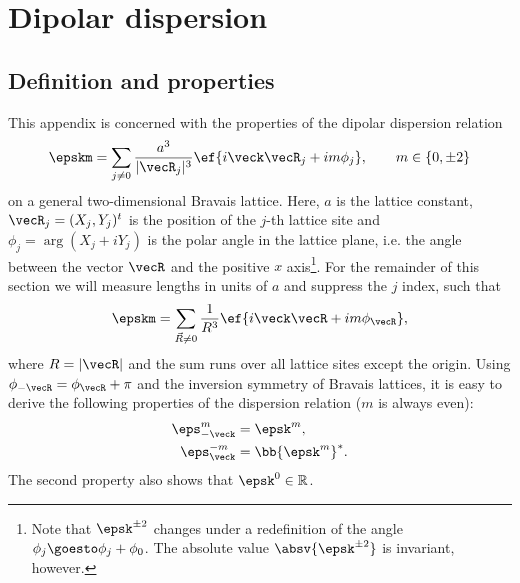 \chapter{Dipolar dispersion}
\label{dipolar_dispersion}

\section{Definition and properties}
This appendix is concerned with the properties of the dipolar dispersion relation~\cite{Peter2012b,Syzranov2014,Peter2014}
\begin{align}
    \epskm = \sum_{j\ne 0} \frac{a^3}{|\vecR_j|^3}\ef{i\veck \vecR_j + i m \phi_{j}},\qquad m \in \{0, \pm 2\}
\end{align}
on a general two-dimensional Bravais lattice.
Here, $a$ is the lattice constant, $\vecR_j=(X_j, Y_j)^t$ is the position of the $j$-th lattice site and $\phi_j = \arg(X_j+i Y_j)$ is the polar angle in the lattice plane, i.e. the angle between the vector $\vecR$ and the positive $x$ axis\footnote{Note that $\epsk^{\pm 2}$ changes under a redefinition of the angle $\phi_j \goesto \phi_j + \phi_0$. The absolute value $\absv{\epsk^{\pm 2}}$ is invariant, however.}. For the remainder of this section we will measure lengths in units of $a$ and suppress the $j$ index, such that
\begin{align}
    \epskm = \sum_{\vec{R}\ne0} \frac{1}{R^3}\ef{i\veck \vecR + i m \phi_{\vecR}},
\end{align}
where $R=|\vecR|$ and the sum runs over all lattice sites except the origin.
Using $\phi_{-\vecR} = \phi_\vecR + \pi$ and the inversion symmetry of Bravais lattices,
it is easy to derive the following properties of the dispersion relation ($m$ is always even):
\begin{align}
    \eps_{-\veck}^m &= \epsk^m, \\
    \eps_{\veck}^{-m} &= \bb{ \epsk^m }^*.
\end{align}
The second property also shows that $\epsk^0 \in \mathbb{R}$.


